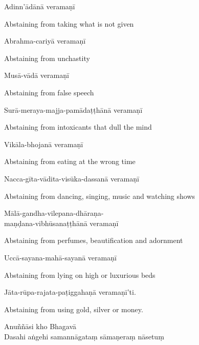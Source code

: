 Adinn'ādānā veramaṇī

\begin{cprenglish}
  Abstaining from taking what is not given
\end{cprenglish}

Abrahma-cariyā veramaṇī

\begin{cprenglish}
  Abstaining from unchastity
\end{cprenglish}

Musā-vādā veramaṇī

\begin{cprenglish}
  Abstaining from false speech
\end{cprenglish}

Surā-meraya-majja-pamādaṭṭhānā veramaṇī

\begin{cprenglish}
  Abstaining from intoxicants that dull the mind
\end{cprenglish}

Vikāla-bhojanā veramaṇī

\begin{cprenglish}
  Abstaining from eating at the wrong time
\end{cprenglish}

Nacca-gīta-vādita-visūka-dassanā veramaṇī

\begin{cprenglish}
  Abstaining from dancing, singing, music and watching shows
\end{cprenglish}

Mālā-gandha-vilepana-dhāraṇa-\\
\vin maṇḍana-vibhūsanaṭṭhānā veramaṇī

\begin{cprenglish}
  Abstaining from perfumes, beautification and adornment
\end{cprenglish}

Uccā-sayana-mahā-sayanā veramaṇī

\begin{cprenglish}
  Abstaining from lying on high or luxurious beds
\end{cprenglish}

Jāta-rūpa-rajata-paṭiggahaṇā veramaṇī'ti.

\begin{cprenglish}
  Abstaining from using gold, silver or money. 
\end{cprenglish}

Anuññāsi kho Bhagavā\\
Dasahi aṅgehi samannāgataṃ sāmaṇeraṃ nāsetuṃ

